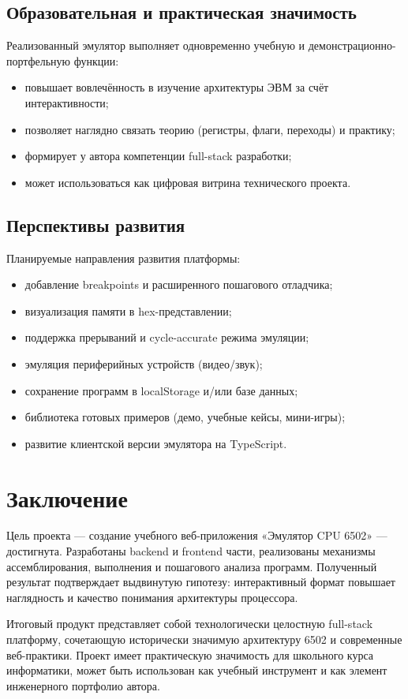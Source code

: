 \documentclass[12pt,a4paper]{article}
\begin{document}
\subsection{Образовательная и практическая значимость}
Реализованный эмулятор выполняет одновременно учебную и демонстрационно-портфельную функции:
\begin{itemize}
  \item повышает вовлечённость в изучение архитектуры ЭВМ за счёт интерактивности;
  \item позволяет наглядно связать теорию (регистры, флаги, переходы) и практику;
  \item формирует у автора компетенции full-stack разработки;
  \item может использоваться как цифровая витрина технического проекта.
\end{itemize}

\subsection{Перспективы развития}
Планируемые направления развития платформы:
\begin{itemize}
  \item добавление breakpoints и расширенного пошагового отладчика;
  \item визуализация памяти в hex-представлении;
  \item поддержка прерываний и cycle-accurate режима эмуляции;
  \item эмуляция периферийных устройств (видео/звук);
  \item сохранение программ в localStorage и/или базе данных;
  \item библиотека готовых примеров (демо, учебные кейсы, мини-игры);
  \item развитие клиентской версии эмулятора на TypeScript.
\end{itemize}

\section{Заключение}
Цель проекта --- создание учебного веб-приложения «Эмулятор CPU 6502» --- достигнута. Разработаны backend и frontend части, реализованы механизмы ассемблирования, выполнения и пошагового анализа программ. Полученный результат подтверждает выдвинутую гипотезу: интерактивный формат повышает наглядность и качество понимания архитектуры процессора.

Итоговый продукт представляет собой технологически целостную full-stack платформу, сочетающую исторически значимую архитектуру 6502 и современные веб-практики. Проект имеет практическую значимость для школьного курса информатики, может быть использован как учебный инструмент и как элемент инженерного портфолио автора.
\end{document}
